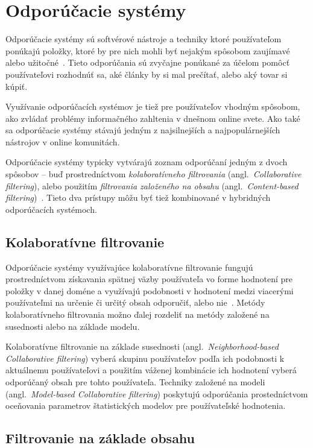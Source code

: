 \section{Odporúčacie systémy}

Odporúčacie systémy sú softvérové nástroje a techniky ktoré používateľom ponúkajú položky, ktoré by pre nich mohli
byť nejakým spôsobom zaujímavé alebo užitočné~\cite{Handbook2011}. Tieto odporúčania sú zvyčajne ponúkané za účelom
pomôcť používateľovi rozhodnúť sa, aké články by si mal prečítať, alebo aký tovar si kúpiť.

Využívanie odporúčacích systémov je tiež pre používateľov vhodným spôsobom, ako zvládať problémy informačného zahltenia
v dnešnom online svete. Ako také sa odporúčacie systémy stávajú jedným z najsilnejších a najpopulárnejších nástrojov
v online komunitách.

Odporúčacie systémy typicky vytvárajú zoznam odporúčaní jedným z dvoch spôsobov -- buď prostredníctvom \emph{kolaboratívneho
filtrovania} (angl.~\emph{Collaborative filtering}), alebo použitím \emph{filtrovania založeného na obsahu}
(angl.~\emph{Content-based filtering})~\cite{Buhmann2011}. Tieto dva prístupy môžu byť tiež kombinované
v hybridných odporúčacích systémoch.

\subsection{Kolaboratívne filtrovanie}\label{rec:collab}

Odporúčacie systémy využívajúce kolaboratívne filtrovanie fungujú prostredníctvom získavania spätnej väzby používateľa
vo forme hodnotení pre položky v danej doméne a využívajú podobnosti v hodnotení medzi viacerými používateľmi na určenie
či určitý obsah odporučiť, alebo nie~\cite{Buhmann2011}. Metódy kolaboratívneho filtrovania možno ďalej rozdeliť
na metódy založené na susednosti alebo na základe modelu.

Kolaboratívne filtrovanie na základe susednosti (angl.~\emph{Neighborhood-based Collaborative filtering})
vyberá skupinu používateľov podľa ich podobnosti k aktuálnemu používateľovi
a použitím váženej kombinácie ich hodnotení vyberá odporúčaný obsah pre tohto používateľa.
Techniky založené na modeli (angl.~\emph{Model-based Collaborative filtering}) poskytujú odporúčania prostedníctvom
oceňovania parametrov štatistických modelov pre používateľské hodnotenia.

\subsection{Filtrovanie na základe obsahu}\label{rec:content}

